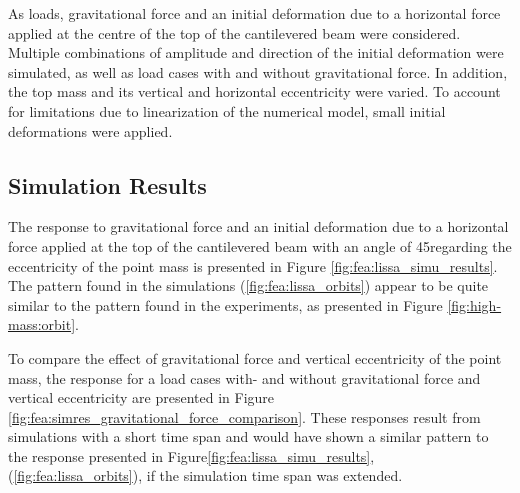 \documentclass{article}
\begin{document}
As loads, gravitational force and an initial deformation due to a horizontal force applied at the centre of the top of the cantilevered beam were considered. Multiple combinations of amplitude and direction of the initial deformation were simulated, as well as load cases with and without gravitational force. In addition, the top mass and its vertical and horizontal eccentricity were varied. To account for limitations due to linearization of the numerical model, small initial deformations were applied.

\subsection{Simulation Results}

The response to gravitational force and an initial deformation due to a horizontal force applied at the top of the  cantilevered beam with an angle of 45\textdegree regarding the eccentricity of the point mass is presented in Figure \autoref{fig:fea:lissa_simu_results}. The pattern found in the simulations (\autoref{fig:fea:lissa_orbits}) appear to be quite similar to the pattern found in the experiments, as presented in Figure \autoref{fig:high-mass:orbit}.

To compare the effect of gravitational force and vertical eccentricity of the point mass, the response  for a load cases with- and without gravitational force and vertical eccentricity are presented in Figure \autoref{fig:fea:simres_gravitational_force_comparison}. These responses result from simulations with a short time span and would have shown a similar pattern to the response presented in Figure\autoref{fig:fea:lissa_simu_results}, (\autoref{fig:fea:lissa_orbits}), if the simulation time span was extended. 
\end{document}

